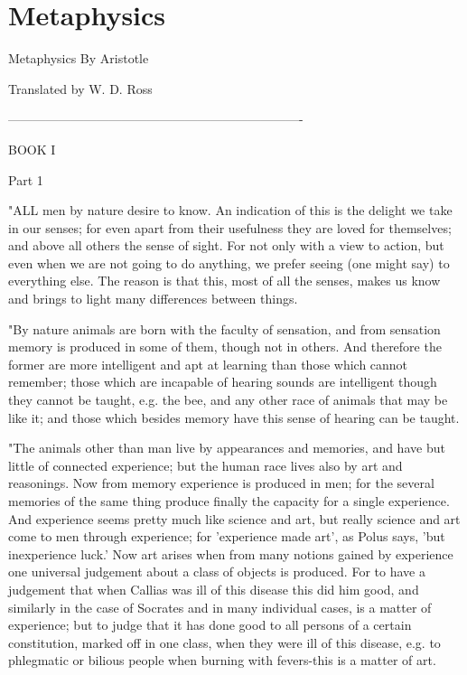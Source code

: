 \chapter{Metaphysics} %
\label{cha:metaphysics}


Metaphysics
By Aristotle


Translated by W. D. Ross

----------------------------------------------------------------------

BOOK I

Part 1 

"ALL men by nature desire to know. An indication of this is the delight
we take in our senses; for even apart from their usefulness they are
loved for themselves; and above all others the sense of sight. For
not only with a view to action, but even when we are not going to
do anything, we prefer seeing (one might say) to everything else.
The reason is that this, most of all the senses, makes us know and
brings to light many differences between things. 

"By nature animals are born with the faculty of sensation, and from
sensation memory is produced in some of them, though not in others.
And therefore the former are more intelligent and apt at learning
than those which cannot remember; those which are incapable of hearing
sounds are intelligent though they cannot be taught, e.g. the bee,
and any other race of animals that may be like it; and those which
besides memory have this sense of hearing can be taught.

"The animals other than man live by appearances and memories, and
have but little of connected experience; but the human race lives
also by art and reasonings. Now from memory experience is produced
in men; for the several memories of the same thing produce finally
the capacity for a single experience. And experience seems pretty
much like science and art, but really science and art come to men
through experience; for 'experience made art', as Polus says, 'but
inexperience luck.' Now art arises when from many notions gained by
experience one universal judgement about a class of objects is produced.
For to have a judgement that when Callias was ill of this disease
this did him good, and similarly in the case of Socrates and in many
individual cases, is a matter of experience; but to judge that it
has done good to all persons of a certain constitution, marked off
in one class, when they were ill of this disease, e.g. to phlegmatic
or bilious people when burning with fevers-this is a matter of art.

